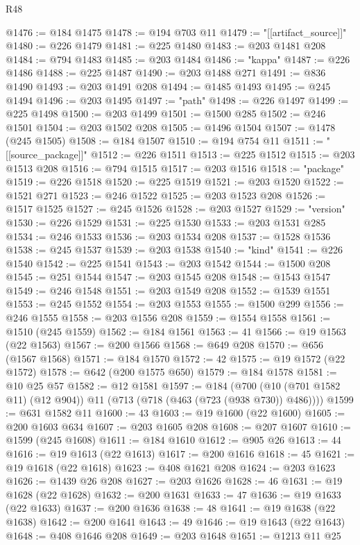 \begin{lexlean}{R48}
\begin{coremodule}
@1476 := @184 @1475
@1478 := @194 @703 @11
@1479 := "[[artifact_source]]"
@1480 := @226 @1479
@1481 := @225 @1480
@1483 := @203 @1481 @208
@1484 := @794 @1483
@1485 := @203 @1484
@1486 := "kappa"
@1487 := @226 @1486
@1488 := @225 @1487
@1490 := @203 @1488 @271
@1491 := @836 @1490
@1493 := @203 @1491 @208
@1494 := @1485 @1493
@1495 := @245 @1494
@1496 := @203 @1495
@1497 := "path"
@1498 := @226 @1497
@1499 := @225 @1498
@1500 := @203 @1499
@1501 := @1500 @285
@1502 := @246 @1501
@1504 := @203 @1502 @208
@1505 := @1496 @1504
@1507 := @1478 (@245 @1505)
@1508 := @184 @1507
@1510 := @194 @754 @11
@1511 := "[[source_package]]"
@1512 := @226 @1511
@1513 := @225 @1512
@1515 := @203 @1513 @208
@1516 := @794 @1515
@1517 := @203 @1516
@1518 := "package"
@1519 := @226 @1518
@1520 := @225 @1519
@1521 := @203 @1520
@1522 := @1521 @271
@1523 := @246 @1522
@1525 := @203 @1523 @208
@1526 := @1517 @1525
@1527 := @245 @1526
@1528 := @203 @1527
@1529 := "version"
@1530 := @226 @1529
@1531 := @225 @1530
@1533 := @203 @1531 @285
@1534 := @246 @1533
@1536 := @203 @1534 @208
@1537 := @1528 @1536
@1538 := @245 @1537
@1539 := @203 @1538
@1540 := "kind"
@1541 := @226 @1540
@1542 := @225 @1541
@1543 := @203 @1542
@1544 := @1500 @208
@1545 := @251 @1544
@1547 := @203 @1545 @208
@1548 := @1543 @1547
@1549 := @246 @1548
@1551 := @203 @1549 @208
@1552 := @1539 @1551
@1553 := @245 @1552
@1554 := @203 @1553
@1555 := @1500 @299
@1556 := @246 @1555
@1558 := @203 @1556 @208
@1559 := @1554 @1558
@1561 := @1510 (@245 @1559)
@1562 := @184 @1561
@1563 := 41
@1566 := @19 @1563 (@22 @1563)
@1567 := @200 @1566
@1568 := @649 @208
@1570 := @656 (@1567 @1568)
@1571 := @184 @1570
@1572 := 42
@1575 := @19 @1572 (@22 @1572)
@1578 := @642 (@200 @1575 @650)
@1579 := @184 @1578
@1581 := @10 @25 @57
@1582 := @12 @1581
@1597 := @184
    (@700 (@10 (@701 @1582 @11) (@12 @904)) @11 (@713 (@718 (@463 (@723 (@938 @730)) @486))))
@1599 := @631 @1582 @11
@1600 := 43
@1603 := @19 @1600 (@22 @1600)
@1605 := @200 @1603 @634
@1607 := @203 @1605 @208
@1608 := @207 @1607
@1610 := @1599 (@245 @1608)
@1611 := @184 @1610
@1612 := @905 @26
@1613 := 44
@1616 := @19 @1613 (@22 @1613)
@1617 := @200 @1616
@1618 := 45
@1621 := @19 @1618 (@22 @1618)
@1623 := @408 @1621 @208
@1624 := @203 @1623
@1626 := @1439 @26 @208
@1627 := @203 @1626
@1628 := 46
@1631 := @19 @1628 (@22 @1628)
@1632 := @200 @1631
@1633 := 47
@1636 := @19 @1633 (@22 @1633)
@1637 := @200 @1636
@1638 := 48
@1641 := @19 @1638 (@22 @1638)
@1642 := @200 @1641
@1643 := 49
@1646 := @19 @1643 (@22 @1643)
@1648 := @408 @1646 @208
@1649 := @203 @1648
@1651 := @1213 @11 @25

\end{coremodule}
\end{lexlean}
